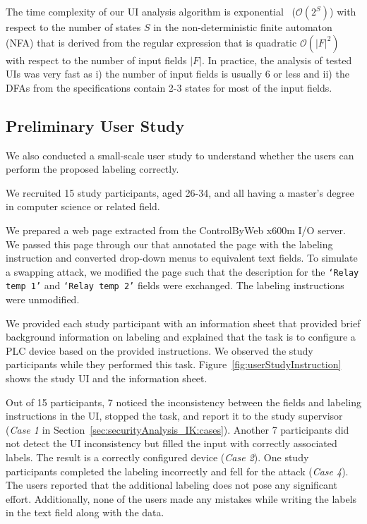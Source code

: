 The time complexity of our UI analysis algorithm is exponential~\cite{Salomaa1997} ($\mathcal{O}(2^S)$) with respect to the number of states $S$ in the non-deterministic finite automaton (NFA) that is derived from the regular expression that is quadratic $\mathcal{O}(|F|^2)$ with respect to the number of input fields $|F|$. In practice, the analysis of tested UIs was very fast as i) the number of input fields is usually 6 or less and ii) the DFAs from the specifications contain 2-3 states for most of the input fields.



\subsection{Preliminary User Study}
\label{sec:results:userStudy}

We also conducted a small-scale user study to understand whether the users can perform the proposed labeling correctly. 

 We recruited 15 study participants, aged 26-34, and all having a master's degree in computer science or related field.

 We prepared a web page extracted from the ControlByWeb x600m I/O server. We passed this page through our \tool that annotated the page with the labeling instruction and converted drop-down menus to equivalent text fields. To simulate a swapping attack, we modified the page such that the description for the \texttt{`Relay temp 1'} and \texttt{`Relay temp 2'} fields were exchanged. The labeling instructions were unmodified.

We provided each study participant with an information sheet that provided brief background information on labeling and explained that the task is to configure a PLC device based on the provided instructions. We observed the study participants while they performed this task. 
Figure~\ref{fig:userStudyInstruction} shows the study UI and the information sheet.

 Out of 15 participants, 7 noticed the inconsistency between the fields and labeling instructions in the UI, stopped the task, and report it to the study supervisor (\emph{Case 1} in Section~\ref{sec:securityAnalysis_IK:cases}). Another 7 participants did not detect the UI inconsistency but filled the input with correctly associated labels. The result is a correctly configured device (\emph{Case 2}). One study participants completed the labeling incorrectly and fell for the attack (\emph{Case 4}). The users reported that the additional labeling does not pose any significant effort. Additionally, none of the users made any mistakes while writing the labels in the text field along with the data. 

